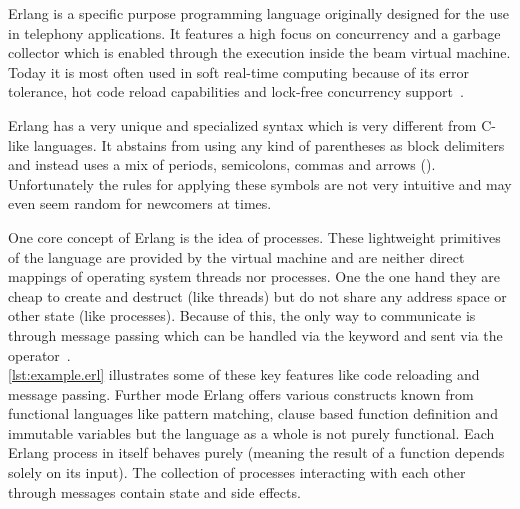 Erlang is a specific purpose programming language originally designed for the use in telephony applications. It features a high focus on concurrency and a garbage collector which is enabled through the execution inside the \gls{beam} virtual machine. Today it is most often used in soft real-time computing because of its error tolerance, hot code reload capabilities and lock-free concurrency support~\cite{intro_erlang}.

Erlang has a very unique and specialized syntax which is very different from C-like languages. It abstains from using any kind of parentheses as block delimiters and instead uses a mix of periods, semicolons, commas and arrows (\mdinline{->}). Unfortunately the rules for applying these symbols are not very intuitive and may even seem random for newcomers at times.

One core concept of Erlang is the idea of processes. These lightweight primitives of the language are provided by the virtual machine and are neither direct mappings of operating system threads nor processes. One the one hand they are cheap to create and destruct (like threads) but do not share any address space or other state (like processes). Because of this, the only way to communicate is through message passing which can be handled via the  keyword and sent via the \mdinline{!} operator~\cite{erlang_phd, intro_erlang}.
\\


\autoref{lst:example.erl} illustrates some of these key features like code reloading and message passing. Further mode Erlang offers various constructs known from functional languages like pattern matching, clause based function definition and immutable variables but the language as a whole is not purely functional. Each Erlang process in itself behaves purely (meaning the result of a function depends solely on its input). The collection of processes interacting with each other through messages contain state and side effects.


